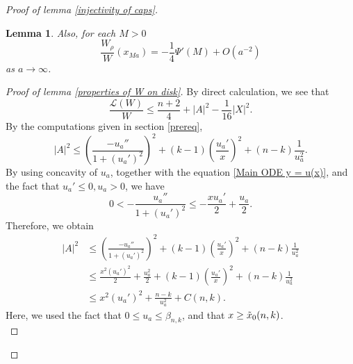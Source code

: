 \documentclass[pdflatex,sn-mathphys-num]{sn-jnl}
\newtheorem{lemma}[theorem]{Lemma}
\begin{document}
\begin{proof}[Proof of lemma \ref{injectivity of caps}]
\begin{lemma}
Also, for each $M > 0$
$$\frac{W_{\rho}}{W}(x_{Ma}) = -\frac{1}{4}\Psi'(M) + O(a^{-2})$$
as $a \to \infty$.
\end{lemma}
\begin{proof}[Proof of lemma \ref{properties of W on disk}]
    By direct calculation, we see that
\begin{equation}\label{estimation of L(W) for caps}
   \frac{ \mathcal{L}(W)}{W} \leq \frac{n + 2}{4} + |A|^2 - \frac{1}{16}|X|^2.
\end{equation}
By the computations given in section \ref{prereq}, 
\begin{equation}
    |A|^2 \leq (\frac{-u_{a}''}{1 + (u_{a}')^2})^2 + (k-1)(\frac{u_{a}'}{x})^2 + (n-k)\frac{1}{u_{a}^2}.
\end{equation}
By using concavity of $u_a$, together with the equation \eqref{Main ODE y = u(x)}, and the fact that $u_a' \leq 0, u_a > 0$, we have
\begin{equation}
    0 < -\frac{u_a''}{1 + (u_a')^2} \leq -\frac{xu_a'}{2} + \frac{u_a}{2}.
\end{equation}
Therefore, we obtain
\begin{align*}
    |A|^2 &\leq (\frac{-u_{a}''}{1 + (u_{a}')^2})^2 + (k-1)(\frac{u_{a}'}{x})^2 + (n-k)\frac{1}{u_{a}^2}\\& \leq \frac{x^2(u_a')^2}{2} + \frac{u_a^2}{2} + (k-1)(\frac{u_{a}'}{x})^2 + (n-k)\frac{1}{u_{a}^2} \\ & \leq x^2(u_a')^2 + \frac{n-k}{u_a^2} + C(n,k).
\end{align*}
Here, we used the fact that $0 \leq u_a \leq \beta_{n,k}$, and that $x \geq 
\Tilde{x}_0(n,k)$. \\


\end{proof}
\end{proof}
\end{document}
